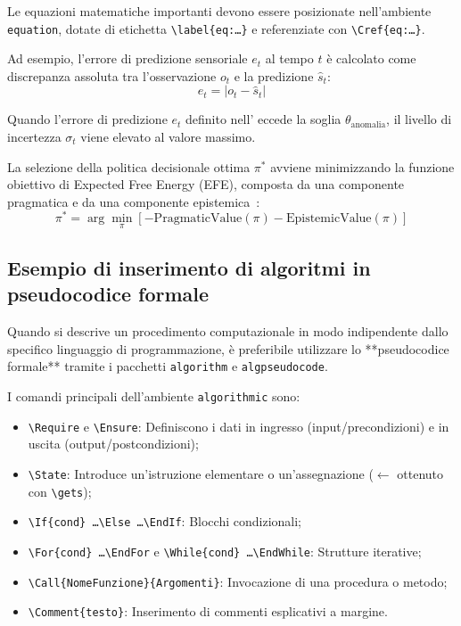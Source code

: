Le equazioni matematiche importanti devono essere posizionate nell'ambiente \texttt{equation}, dotate di etichetta \texttt{\textbackslash label\{eq:\dots\}} e referenziate con \texttt{\textbackslash Cref\{eq:\dots\}}.

Ad esempio, l'errore di predizione sensoriale $e_t$ al tempo $t$ è calcolato come discrepanza assoluta tra l'osservazione $o_t$ e la predizione $\hat{s}_t$:
\begin{equation}
e_t = \left| o_t - \hat{s}_t \right|
\label{eq:prediction-error}
\end{equation}

Quando l'errore di predizione $e_t$ definito nell' eccede la soglia $\theta_{\mathrm{anomalia}}$, il livello di incertezza $\sigma_t$ viene elevato al valore massimo.

La selezione della politica decisionale ottima $\pi^*$ avviene minimizzando la funzione obiettivo di Expected Free Energy (EFE), composta da una componente pragmatica e da una componente epistemica~\cite{friston2015epistemic}:
\begin{equation}
\pi^* = \arg\min_{\pi} \left[ -\mathrm{PragmaticValue}(\pi) - \mathrm{EpistemicValue}(\pi) \right]
\label{eq:efe-decision}
\end{equation}


\subsection{Esempio di inserimento di algoritmi in pseudocodice formale}
\label{sec:esempi-algoritmi}

Quando si descrive un procedimento computazionale in modo indipendente dallo specifico linguaggio di programmazione, è preferibile utilizzare lo **pseudocodice formale** tramite i pacchetti \texttt{algorithm} e \texttt{algpseudocode}.

I comandi principali dell'ambiente \texttt{algorithmic} sono:
\begin{itemize}
    \item \texttt{\textbackslash Require} e \texttt{\textbackslash Ensure}: Definiscono i dati in ingresso (input/precondizioni) e in uscita (output/postcondizioni);
    \item \texttt{\textbackslash State}: Introduce un'istruzione elementare o un'assegnazione ($\gets$ ottenuto con \texttt{\textbackslash gets});
    \item \texttt{\textbackslash If\{cond\} \dots \textbackslash Else \dots \textbackslash EndIf}: Blocchi condizionali;
    \item \texttt{\textbackslash For\{cond\} \dots \textbackslash EndFor} e \texttt{\textbackslash While\{cond\} \dots \textbackslash EndWhile}: Strutture iterative;
    \item \texttt{\textbackslash Call\{NomeFunzione\}\{Argomenti\}}: Invocazione di una procedura o metodo;
    \item \texttt{\textbackslash Comment\{testo\}}: Inserimento di commenti esplicativi a margine.
\end{itemize}

